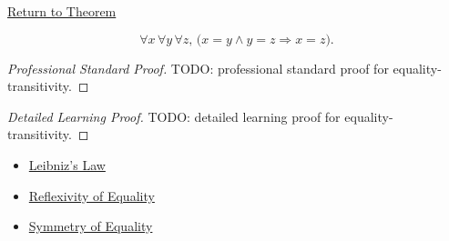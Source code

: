 \newpage
{}
\label{prf:equality-transitivity}

\begin{remark*}[Return]
\hyperref[thm:equality-transitivity]{Return to Theorem}
\end{remark*}

\begin{theorem*}
\[
\forall x\,\forall y\,\forall z,\,
\bigl(x=y \land y=z \Longrightarrow x=z\bigr).
\]
\end{theorem*}

\begin{proof}[Professional Standard Proof]
\LRAProofBodyStart
TODO: professional standard proof for equality-transitivity.
\end{proof}

\begin{proof}[Detailed Learning Proof]
\LRAProofBodyStart
TODO: detailed learning proof for equality-transitivity.
\end{proof}

\begin{remark*}
\end{remark*}

\begin{dependencies}
\begin{itemize}
  \item \hyperref[ax:leibniz-law]{Leibniz's Law}
  \item \hyperref[ax:equality-reflexivity]{Reflexivity of Equality}
  \item \hyperref[thm:equality-symmetry]{Symmetry of Equality}
\end{itemize}
\end{dependencies}

\clearpage
